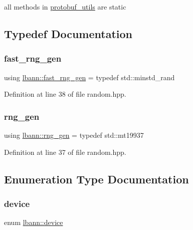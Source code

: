 all methods in \hyperlink{classlbann_1_1protobuf__utils}{protobuf\+\_\+utils} are static 

\subsection{Typedef Documentation}
\mbox{\label{namespacelbann_af16616ffa6a3616836eabadd6ce837ec}} 
\subsubsection{\texorpdfstring{fast\+\_\+rng\+\_\+gen}{fast\_rng\_gen}}
{\footnotesize\ttfamily using \hyperlink{namespacelbann_af16616ffa6a3616836eabadd6ce837ec}{lbann\+::fast\+\_\+rng\+\_\+gen} = typedef std\+::minstd\+\_\+rand}



Definition at line 38 of file random.\+hpp.

\mbox{\label{namespacelbann_aab7fa584bac85b9085aa8b8c5a888356}} 
\subsubsection{\texorpdfstring{rng\+\_\+gen}{rng\_gen}}
{\footnotesize\ttfamily using \hyperlink{namespacelbann_aab7fa584bac85b9085aa8b8c5a888356}{lbann\+::rng\+\_\+gen} = typedef std\+::mt19937}



Definition at line 37 of file random.\+hpp.



\subsection{Enumeration Type Documentation}
\mbox{\label{namespacelbann_a3ce21fcce81d74fe54c2f4b5b5b48d9a}} 
\subsubsection{\texorpdfstring{device}{device}}
{\footnotesize\ttfamily enum \hyperlink{namespacelbann_a3ce21fcce81d74fe54c2f4b5b5b48d9a}{lbann\+::device}\hspace{0.3cm}{\ttfamily [strong]}}

